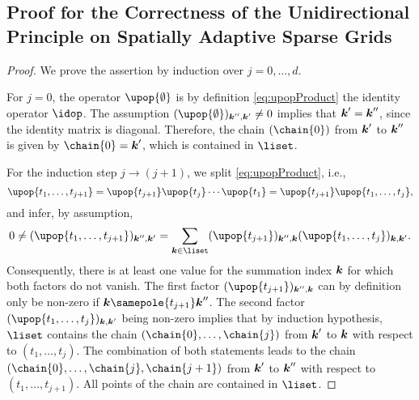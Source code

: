 \printornamentsfalse
\subsection{%
  Proof for the Correctness of the Unidirectional Principle on
  Spatially Adaptive Sparse Grids%
}
\label{sec:proofCorrectnessUnidirectionalPrincipleSASG}
\printornamentstrue

\lemmaChainExistenceSufficient*

\begin{proof}
  We prove the assertion by induction over $j = 0, \dotsc, d$.
  
  For $j = 0$, the operator $\upop{\emptyset}$ is by definition
  \eqref{eq:upopProduct} the identity operator $\idop$.
  The assumption $(\upop{\emptyset})_{\*k'',\*k'} \not= 0$
  implies that ${\boldsymbol{k}}' = {\boldsymbol{k}}''$, since the identity matrix is diagonal.
  Therefore, the chain $(\chain{0})$ from ${\boldsymbol{k}}'$ to ${\boldsymbol{k}}''$ is given by
  $\chain{0} = \*k'$, which is contained in $\liset$.
  
  For the induction step $j \to (j+1)$, we split \cref{eq:upopProduct},
  i.e.,
  \begin{equation}
    \upop{t_1,\dotsc,t_{j+1}}
    = \upop{t_{j+1}} \upop{t_j} \dotsm \upop{t_1}
    = \upop{t_{j+1}} \upop{t_1,\dotsc,t_j},
  \end{equation}
  and infer, by assumption,
  \begin{equation}
    \label{eq:proofLemmaChainExistenceSufficient1}
    0
    \not= (\upop{t_1,\dotsc,t_{j+1}})_{\*k'',\*k'}
    = \sum_{\*k \in \liset} (\upop{t_{j+1}})_{\*k'',\*k}
    (\upop{t_1,\dotsc,t_j})_{\*k,\*k'}.
  \end{equation}
  Consequently,
  there is at least one value for the summation index ${\boldsymbol{k}}$
  for which both factors do not vanish.
  The first factor $(\upop{t_{j+1}})_{\*k'',\*k}$ can by definition
  only be non-zero if $\*k \samepole{t_{j+1}} \*k''$.
  The second factor $(\upop{t_1,\dotsc,t_j})_{\*k,\*k'}$ being
  non-zero implies that by induction hypothesis,
  $\liset$ contains the chain $(\chain{0}, \dotsc, \chain{j})$
  from ${\boldsymbol{k}}'$ to ${\boldsymbol{k}}$ with respect to $(t_1, \dotsc, t_j)$.
  The combination of both statements leads to
  the chain $(\chain{0}, \dotsc, \chain{j}, \chain{j+1})$ from ${\boldsymbol{k}}'$
  to ${\boldsymbol{k}}''$ with respect to $(t_1, \dotsc, t_{j+1})$.
  All points of the chain are contained in $\liset$.
\end{proof}

\lemmaChainExistenceNecessary*

